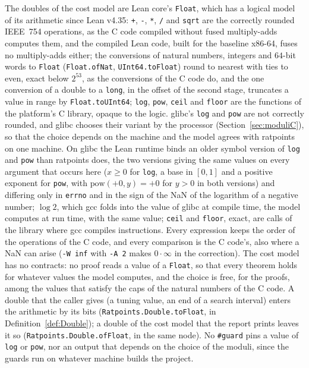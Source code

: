The doubles of the cost model are Lean core's \verb|Float|, which has a logical model of its
arithmetic since Lean v4.35: \verb|+|, \verb|-|, \verb|*|, \verb|/| and \verb|sqrt| are the
correctly rounded IEEE~754 operations, as the C code compiled without fused multiply-adds computes
them, and the compiled Lean code, built for the baseline x86-64, fuses no multiply-adds either; the
conversions of natural numbers, integers and $64$-bit words to \verb|Float| (\verb|Float.ofNat|,
\verb|UInt64.toFloat|) round to nearest with ties to even, exact below $2^{53}$, as the conversions
of the C code do, and the one conversion of a double to a \verb|long|, in the offset of the second
stage, truncates a value in range by \verb|Float.toUInt64|; \verb|log|, \verb|pow|, \verb|ceil| and
\verb|floor| are the functions of the platform's C library, opaque to the logic. glibc's \verb|log|
and \verb|pow| are not correctly rounded, and glibc chooses their variant by the processor
(Section~\ref{sec:moduliC}), so that the choice depends on the machine and the model agrees with
ratpoints on one machine. On glibc the Lean runtime binds an older symbol version of \verb|log| and
\verb|pow| than ratpoints does, the two versions giving the same values on every argument that
occurs here ($x \ge 0$ for \verb|log|, a base in $[0, 1]$ and a positive exponent for \verb|pow|,
with $\mathrm{pow}(+0, y) = +0$ for $y > 0$ in both versions) and differing only in \verb|errno| and
in the sign of the NaN of the logarithm of a negative number; $\log 2$, which gcc folds into the
value of glibc at compile time, the model computes at run time, with the same value; \verb|ceil| and
\verb|floor|, exact, are calls of the library where gcc compiles instructions. Every expression
keeps the order of the operations of the C code, and every comparison is the C code's, also where a
NaN can arise (\verb|-W inf| with \verb|-A 2| makes $0 \cdot \infty$ in the correction). The cost
model has no contracts: no proof reads a value of a \verb|Float|, so that every theorem holds for
whatever values the model computes, and the choice is free, for the proofs, among the values that
satisfy the caps of the natural numbers of the C code. A double that the caller gives (a tuning
value, an end of a search interval) enters the arithmetic by its bits
(\verb|Ratpoints.Double.toFloat|, in Definition~\ref{def:Double}); a double of the cost model that
the report prints leaves it so (\verb|Ratpoints.Double.ofFloat|, in the same node). No \verb|#guard|
pins a value of \verb|log| or \verb|pow|, nor an output that depends on the choice of the moduli,
since the guards run on whatever machine builds the project.

